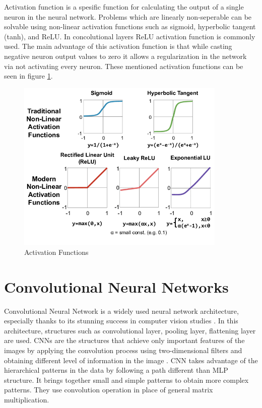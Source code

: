 Activation function is a spesific function for calculating the output of a single neuron in the neural network. Problems which are linearly non-seperable can be solvable using non-linear activation functions such as sigmoid, hyperbolic tangent (tanh), and ReLU. In concolutional layers ReLU activation function is commonly used. The main advantage of this activation function is that while casting negative neuron output values to zero it allows a regularization in the network via not activating every neuron. These mentioned activation functions can be seen in figure \ref{fig:activation_functions}.

\begin{figure}[h!]
    \centering
    \includegraphics[width=10cm]{figures/chapter3/activation_functions.png}
    \caption{Activation Functions \cite{activation_functions}}
    \label{fig:activation_functions}
\end{figure}

\section{Convolutional Neural Networks}

Convolutional Neural Network is a widely used neural network architecture, especially thanks to its stunning success in computer vision studies \cite{leNet}. In this architecture, structures such as convolutional layer, pooling layer, flattening layer are used. CNNs are the structures that achieve only important features of the images by applying the convolution process using two-dimensional filters and obtaining different level of information in the image \cite{CNN_review}. CNN takes advantage of the hierarchical patterns in the data by following a path different than MLP structure. It brings together small and simple patterns to obtain more complex patterns. They use convolution operation in place of general matrix multiplication.


